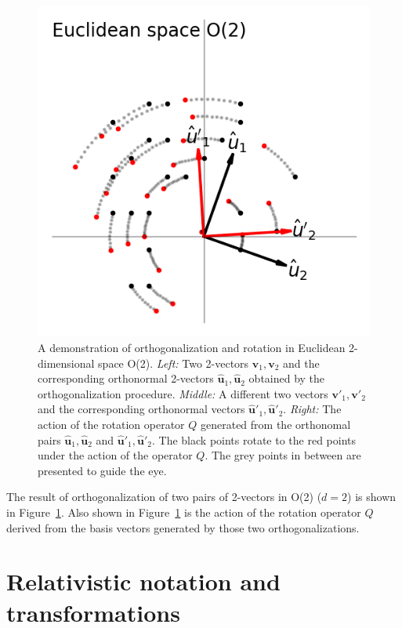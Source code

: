 \documentclass{article}
\newcommand{\Evec}[1]{{\mathbf{#1}}} %
\newcommand{\Ehat}[1]{{\mathbf{\hat{#1}}}} %
\newcommand{\figref}[1]{Figure~\ref{#1}}
\newlength{\figurewidth}
\begin{document}
\begin{figure}[t]
\begin{mdframed}
\includegraphics[width=\figurewidth]{E_Q.png}
\caption{A demonstration of orthogonalization and rotation in Euclidean 2-dimensional space O(2).
    \textsl{Left:} Two 2-vectors $\Evec{v}_1, \Evec{v}_2$ and the corresponding orthonormal 2-vectors $\Ehat{u}_1, \Ehat{u}_2$ obtained by the orthogonalization procedure.
\textsl{Middle:} A different two vectors $\Evec{v}'_1, \Evec{v}'_2$ and the corresponding orthonormal vectors $\Ehat{u}'_1, \Ehat{u}'_2$.
\textsl{Right:} The action of the rotation operator $Q$ generated from the orthonomal pairs $\Ehat{u}_1, \Ehat{u}_2$ and $\Ehat{u}'_1, \Ehat{u}'_2$.
The black points rotate to the red points under the action of the operator $Q$.
The grey points in between are presented to guide the eye.\label{fig:Euclid}}
\end{mdframed}
\end{figure}
The result of orthogonalization of two pairs of 2-vectors in O(2) ($d=2$) is shown in \figref{fig:Euclid}.
Also shown in \figref{fig:Euclid} is the action of the rotation operator $Q$ derived from the basis vectors generated by those two orthogonalizations.

\section{Relativistic notation and transformations}\label{sec:notation}
\end{document}
